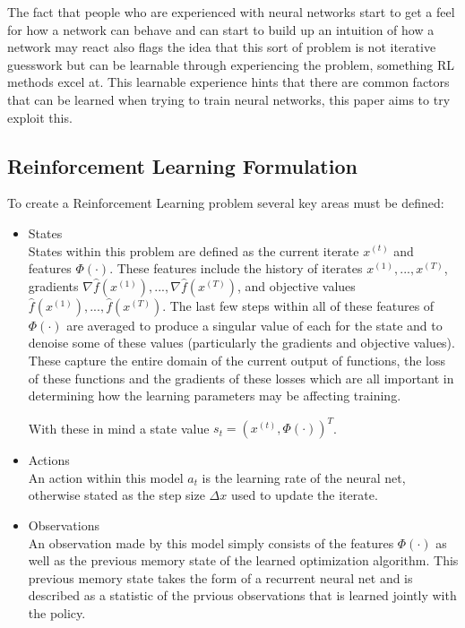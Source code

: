 \documentclass[sigconf]{acmart}
\begin{document}
The fact that people who are experienced with neural networks start to get a feel for how a network can behave and can start to build up an intuition of how a network may react also flags the idea that this sort of problem is not iterative guesswork but can be learnable through experiencing the problem, something RL methods excel at.
This learnable experience hints that there are common factors that can be learned when trying to train neural networks, this paper aims to try exploit this.
\subsection{Reinforcement Learning Formulation}
To create a Reinforcement Learning problem several key areas must be defined:
\begin{itemize}
  \item States\\
  States within this problem are defined as the current iterate $x^{(t)}$ and features $\Phi(\cdot)$. These features include the history of iterates $x^{(1)},...,x^{(T)}$, gradients $\nabla \hat{f}(x^{(1)}),...,\nabla \hat{f}(x^{(T)})$, and objective values $\hat{f}(x^{(1)}),...,\hat{f}(x^{(T)})$.
  The last few steps within all of these features of $\Phi(\cdot)$ are averaged to produce a singular value of each for the state and to denoise some of these values (particularly the gradients and objective values).
  These capture the entire domain of the current output of functions, the loss of these functions and the gradients of these losses which are all important in determining how the learning parameters may be affecting training.
  
  With these in mind a state value $s_t = (x^{(t)}, \Phi(\cdot))^T$.
  \item Actions\\
  An action within this model $a_t$ is the learning rate of the neural net, otherwise stated as the step size $\Delta x$ used to update the iterate. 
  \item Observations\\
  An observation made by this model simply consists of the features $\Phi(\cdot)$ as well as the previous memory state of the learned optimization algorithm.
  This previous memory state takes the form of a recurrent neural net and is described as a statistic of the prvious observations that is learned jointly with the policy.


\end{itemize}
\end{document}

